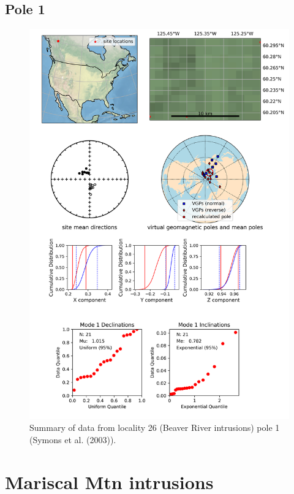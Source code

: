 \documentclass{article}
\begin{document}
\subsection{Pole 1}


\begin{figure}[H]
\centering
\includegraphics[width=5 in]{./26/1/pole_summary.png}
\caption{Summary of data from locality 26 (Beaver River intrusions) pole 1 (Symons et al. (2003)).}
\end{figure}

\section{Mariscal Mtn intrusions}
\end{document}
